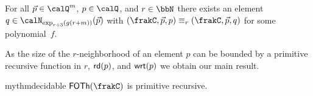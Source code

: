 \begin{corollary}\label{cor:equivalence}
	For all $\vec{p}\in \Qx^m$, $p\in \Qx$, and $r\in\bbN$ there exists an element $q\in \calN_{\exp_{r+3}(g(r+m))}(\vec{p})$ with $(\frakC, \vec{p}, p) \equiv_r (\frakC,\vec{p}, q)$ for some polynomial~$f$.
\end{corollary}
As the size of the $r$-neighborhood of an element $p$ can be bounded by a primitive recursive function in $r$, $\mathsf{rd}(p)$, and $\mathsf{wrt}(p)$ we obtain our main result.
\begin{restatable}{mythm}{decidable}
	$\FOTh{\frakC}$ is primitive recursive.
\end{restatable}
